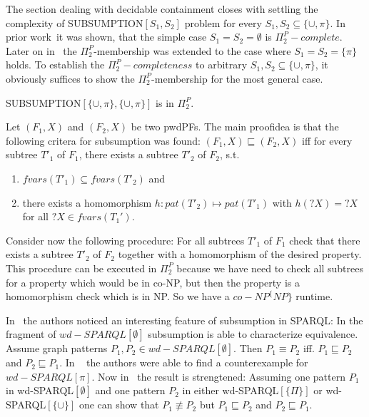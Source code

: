 The section dealing with decidable containment closes with settling the
complexity of SUBSUMPTION$[S_1,S_2]$ problem for every $S_1, S_2 \subseteq \{
\cup, \pi \}$. In prior work~\cite{letelier2013static}it was shown, that the simple case
$S_1=S_2=\emptyset$ is $\Pi_2^P-complete$. 
Later on in~\cite{letelier2013static} the $\Pi^P_2$-membership 
was extended to the case where $S_1 = S_2 = \{\pi\}$ holds.
To establish the $\Pi^P_2-completeness$ to arbitrary $S_1,S_2 \subseteq \{ \cup,
\pi \}$, it obviously suffices to show the $\Pi_2^P$-membership for the most general case.

\begin{theorem}\label{scuppicuppi}
	SUBSUMPTION$[\{\cup,\pi\}, \{ \cup, \pi \}]$ is in $\Pi^P_2$.
\end{theorem}
\begin{proofidea}
	Let $(F_1,X)$ and $(F_2,X)$ be two pwdPFs.
	The main proofidea is that the following critera for subsumption was found:
	$(F_1,X) \sqsubseteq (F_2,X)$ iff for every subtree $T'_1$ of $F_1$, there
	exists a subtree $T'_2$ of $F_2$, s.t.
	\begin{enumerate}
		\item $fvars(T'_1) \subseteq fvars(T'_2)$ and
		\item there exists a homomorphism $h:pat(T'_2) \mapsto pat(T'_1)$
			with $h(?X)= ?X$ for all $?X \in fvars(T_1')$.
	\end{enumerate}
	Consider now the following procedure:
	For all subtrees $T'_1$ of $F_1$ check that there exists a subtree $T'_2$ of
	$F_2$ together with a homomorphism of the desired property. This procedure
	can be executed in $\Pi_2^P$ because we have need to check all subtrees
	for a property which would be in co-NP, but then the property is a
	homomorphism check which is in NP. So we have a $co-NP^\{NP\}$ runtime.
\end{proofidea}

In~\cite{letelier2012static} the authors noticed an interesting feature of
subsumption in SPARQL: In the fragment of $wd-SPARQL[\emptyset]$ subsumption is
able to characterize equivalence. Assume graph patterns $P_1,P_2 \in
wd-SPARQL[\emptyset]$. Then $P_1 \equiv P_2$ iff. $P_1 \sqsubseteq P_2$ and 
$P_2 \sqsubseteq P_1$. In ~\cite{letelier2013static} the authors were able to
find a counterexample for $wd-SPARQL[\pi]$. 
Now in~\cite{pichler2014containment} the result is strengtened:
Assuming one pattern $P_1$ in wd-SPARQL$[\emptyset]$ and one pattern $P_2$ in either
wd-SPARQL$[\{\Pi\}]$ or wd-SPARQL$[\{\cup\}]$ one can show that $P_1 \not\equiv
P_2$ but $P_1 \sqsubseteq P_2$ and $P_2 \sqsubseteq P_1$.

